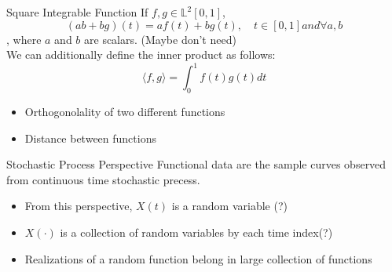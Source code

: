 \documentclass{beamer}
\begin{document}
	\begin{frame}{Square Integrable Function}
		If $f, g \in \mathbb{L}^{2}[0,1]$,
		$$(ab + bg)(t) = af(t) + bg(t), \quad t \in [0,1] and \forall a,b$$
		, where $a$ and $b$ are scalars. (Maybe don't need)\\
		We can additionally define the inner product as follows:
		$$\langle f,g \rangle = \int_{0}^{1} f(t)g(t)dt$$
		\begin{itemize}
			\item Orthogonolality of two different functions
			\item Distance between functions
		\end{itemize}
	\end{frame}
	
	\begin{frame}{Stochastic Process Perspective}
		Functional data are the sample curves observed from continuous time stochastic precess.\\
		\begin{itemize}
			\item From this perspective, $X(t)$ is a random variable (?)\\
			\item $X(\cdot)$ is a collection of random variables by each time index(?)\\
			\item Realizations of a random function belong in large collection of functions
		\end{itemize}		
	\end{frame}
	
\end{document}
